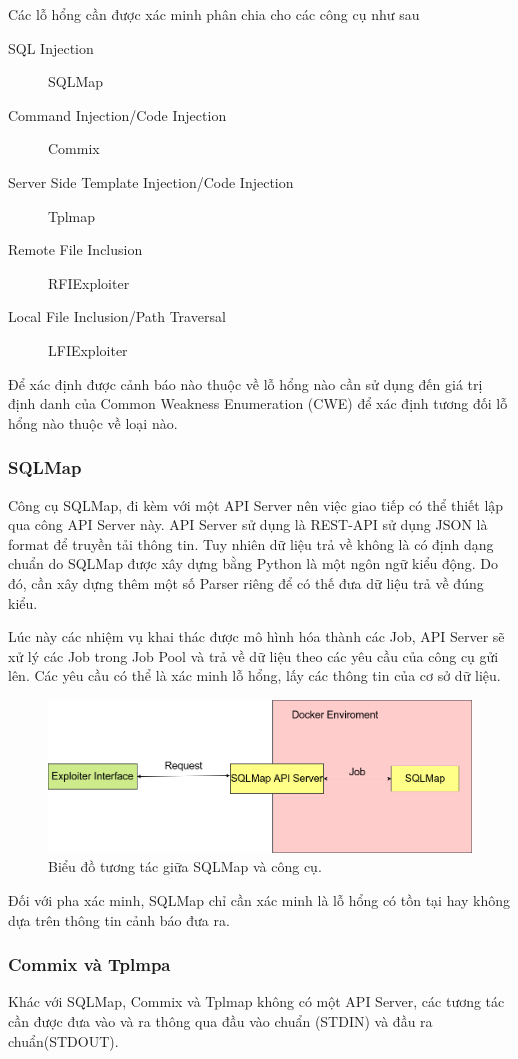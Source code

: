 \documentclass[./../main.tex]{subfiles}
\begin{document}
Các lỗ hổng cần được xác minh phân chia cho các công cụ như sau
\begin{description}
	\item[SQL Injection] SQLMap
	\item [Command Injection/Code Injection] Commix
	\item [Server Side Template Injection/Code Injection] Tplmap
	\item [Remote File Inclusion] RFIExploiter
	\item [Local File Inclusion/Path Traversal] LFIExploiter
\end{description}
Để xác định được cảnh báo nào thuộc về lỗ hổng nào cần sử dụng đến giá trị định danh của Common Weakness Enumeration (CWE) để xác định tương đối lỗ hổng nào thuộc về loại nào.
\subsubsection{SQLMap}
Công cụ SQLMap, đi kèm với một API Server nên việc giao tiếp có thể thiết lập qua công API Server này. API Server sử dụng là REST-API sử dụng JSON là format để truyền tải thông tin. Tuy nhiên dữ liệu trả về không là có định dạng chuẩn do SQLMap được xây dựng bằng Python là một ngôn ngữ kiểu động. Do đó, cần xây dựng thêm một số Parser riêng để có thế đưa dữ liệu trả về đúng kiểu.

Lúc này các nhiệm vụ khai thác được mô hình hóa thành các Job, API Server sẽ xử lý các Job trong Job Pool và trả về dữ liệu theo các yêu cầu của công cụ gửi lên. Các yêu cầu có thể là xác minh lỗ hổng, lấy các thông tin của cơ sở dữ liệu.


\begin{figure}[h!]
	\includegraphics[width=\linewidth]{./images/SQLMap.png}
	\caption{Biểu đồ tương tác giữa SQLMap và công cụ.}
	\label{fig:sqlmap}
\end{figure}

Đối với pha xác minh, SQLMap chỉ cần xác minh là lỗ hổng có tồn tại hay không dựa trên thông tin cảnh báo đưa ra.
\subsubsection{Commix và Tplmpa}
Khác với SQLMap, Commix và Tplmap không có một API Server, các tương tác cần được đưa vào và ra thông qua đầu vào chuẩn (STDIN) và đầu ra chuẩn(STDOUT).
\end{document}

